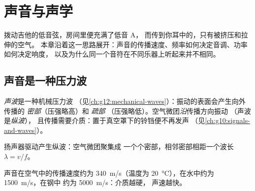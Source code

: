 \chapter{声音与声学}\label{ch:g12:sound-acoustics}

拨动吉他的低音弦，房间里便充满了低音 A，
而传到你耳中的，只有被挤压和拉伸的空气。
本章沿着这一思路展开：声音的传播速度、频率如何决定音调、功率如何决定响度，
以及为什么同一个音符在不同乐器上听起来并不相同。

\section{声音是一种压力波}

\begin{definition}[声波]\label{def:g12:sound-acoustics:sound-wave}
\emph{声波}是一种机械压力波
（见\cref{ch:g12:mechanical-waves}）：振动的表面会产生向外传播的
\emph{密部}（压强略高）和
\emph{疏部}
（压强略低）。空气微团\emph{沿}传播方向振动
（声波是\emph{纵波}），
且传播需要介质：置于真空罩下的铃铛便不再发声
（见\cref{ch:g10:signals-and-waves}）。
\end{definition}

\begin{omfigure}

{\small 扬声器驱动产生纵波：空气微团聚集成
一个个密部，相邻密部相距一个波长 $\lambda = v/f$。}
\end{omfigure}

\begin{proposition}[声速]\label{prop:g12:sound-acoustics:speed}
%
声音在空气中的传播速度约为 \qty{340}{m/s}（温度为
\qty{20}{\degreeCelsius}），在水中约为 \qty{1500}{m/s}，在钢中
约为 \qty{5000}{m/s}：介质越硬，
声速越快。\admitted
\end{proposition}

